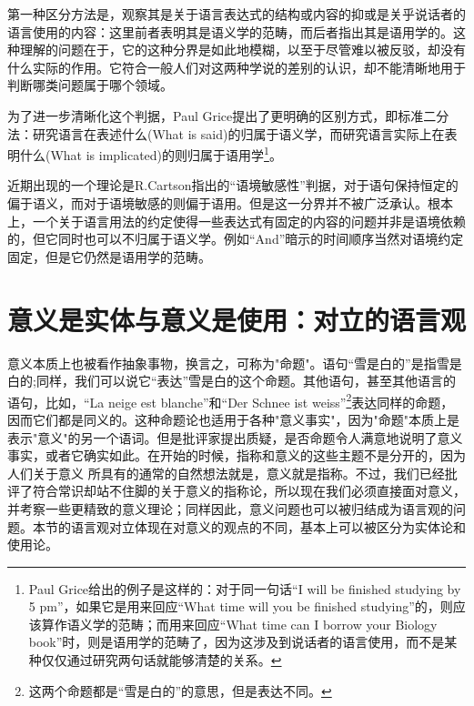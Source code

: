 \documentclass{article}
\begin{document}
第一种区分方法是，观察其是关于语言表达式的结构或内容的抑或是关乎说话者的语言使用的内容：这里前者表明其是语义学的范畴，而后者指出其是语用学的。这种理解的问题在于，它的这种分界是如此地模糊，以至于尽管难以被反驳，却没有什么实际的作用。它符合一般人们对这两种学说的差别的认识，却不能清晰地用于判断哪类问题属于哪个领域。

为了进一步清晰化这个判据，Paul Grice提出了更明确的区别方式，即标准二分法：研究语言在表述什么(What is said)的归属于语义学，而研究语言实际上在表明什么(What is implicated)的则归属于语用学\footnote{Paul Grice给出的例子是这样的：对于同一句话“I will be finished studying by 5 pm”，如果它是用来回应“What time will you be finished studying”的，则应该算作语义学的范畴；而用来回应“What time can I borrow your Biology book”时，则是语用学的范畴了，因为这涉及到说话者的语言使用，而不是某种仅仅通过研究两句话就能够清楚的关系。}。

近期出现的一个理论是R.Cartson指出的“语境敏感性”判据，对于语句保持恒定的偏于语义，而对于语境敏感的则偏于语用。但是这一分界并不被广泛承认。根本上，一个关于语言用法的约定使得一些表达式有固定的内容的问题并非是语境依赖的，但它同时也可以不归属于语义学。例如“And”暗示的时间顺序当然对语境约定固定，但是它仍然是语用学的范畴。
\section{意义是实体与意义是使用：对立的语言观}
意义本质上也被看作抽象事物，换言之，可称为"命题"。语句“雪是白的”是指雪是白的;同样，我们可以说它“表达”雪是白的这个命题。其他语句，甚至其他语言的语句，比如，“La neige est blanche”和“Der Schnee ist weiss”\footnote{这两个命题都是“雪是白的”的意思，但是表达不同。}表达同样的命题，因而它们都是同义的。这种命题论也适用于各种"意义事实"，因为"命题"本质上是表示"意义"的另一个语词。但是批评家提出质疑，是否命题令人满意地说明了意义事实，或者它确实如此。在开始的时候，指称和意义的这些主题不是分开的，因为人们关于意义 所具有的通常的自然想法就是，意义就是指称。不过，我们已经批评了符合常识却站不住脚的关于意义的指称论，所以现在我们必须直接面对意义，并考察一些更精致的意义理论；同样因此，意义问题也可以被归结成为语言观的问题。本节的语言观对立体现在对意义的观点的不同，基本上可以被区分为实体论和使用论。
\end{document}
